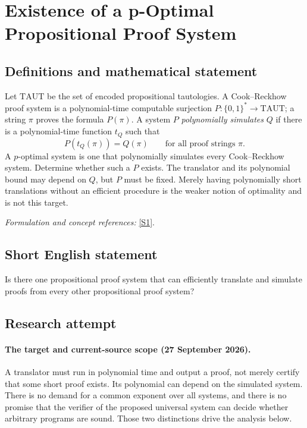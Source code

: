 \documentclass[11pt]{article}
\begin{document}
\section*{\texorpdfstring{Existence of a p-Optimal Propositional Proof System}{Existence of a p-Optimal Propositional Proof System}}\label{30006880}
\subsection{Definitions and mathematical statement}
Let $\mathrm{TAUT}$ be the set of encoded propositional tautologies. A Cook--Reckhow proof system is a polynomial-time computable surjection $P:\{0,1\}^*\to\mathrm{TAUT}$; a string $\pi$ proves the formula $P(\pi)$. A system $P$ \emph{polynomially simulates} $Q$ if there is a polynomial-time function $t_Q$ such that
\[
 P(t_Q(\pi))=Q(\pi)\qquad\text{for all proof strings }\pi.
\]
A $p$-optimal system is one that polynomially simulates every Cook--Reckhow system. Determine whether such a $P$ exists. The translator and its polynomial bound may depend on $Q$, but $P$ must be fixed. Merely having polynomially short translations without an efficient procedure is the weaker notion of optimality and is not this target.
\par\smallskip\textit{Formulation and concept references:} \href{https://eccc.weizmann.ac.il/eccc-reports/1997/TR97-026/index.html}{[S1]}.

\subsection{Short English statement}
Is there one propositional proof system that can efficiently translate and simulate proofs from every other propositional proof system?
\subsection{Research attempt}
\paragraph{The target and current-source scope (27 September 2026).}
A translator must run in polynomial time and output a proof, not merely
certify that some short proof exists. Its polynomial can depend on the
simulated system. There is no demand for a common exponent over all
systems, and there is no promise that the verifier of the proposed
universal system can decide whether arbitrary programs are sound.
Those two distinctions drive the analysis below.
\end{document}
